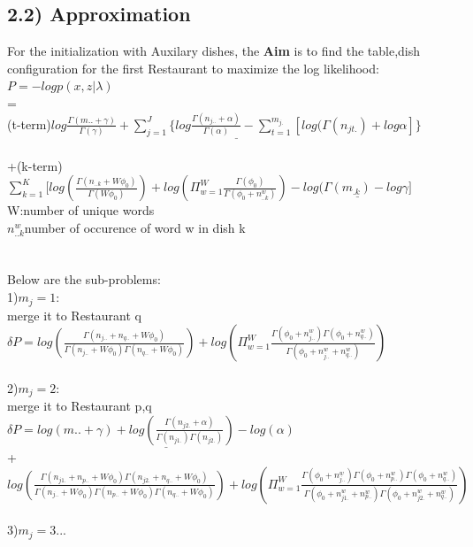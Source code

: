 \documentclass{article}
\begin{document}
\begin{spacing}{1.1}
\subsection{2.2) Approximation}
For the initialization with Auxilary dishes, the {\bf Aim} is to find the table,dish configuration for the first Restaurant
to maximize the log likelihood:\\
$P=-log p(x,z|\lambda)$\\ =\\
(t-term)$ \underline{log \frac{\Gamma(m..+\gamma)}{\Gamma(\gamma)}+\sum_{j=1}^{J} \{log \frac{\Gamma(n_{j..}+\alpha)}{\Gamma(\alpha)}-\sum_{t=1}^{m_{j.}}[log(\Gamma(n_{jt.})+log \alpha
]\}}$\\ \\
+(k-term)$ \sum_{k=1}^{K} [log(\frac{\Gamma(n_{..k}+W\phi_{0})}{\Gamma(W\phi_{0})})+log(\Pi_{w=1}^{W}\frac{\Gamma(\phi_{0})}{\Gamma(\phi_{0}+n_{..k}^{w})})
-\underline{log(\Gamma(m_{.k})-log \gamma]}$\\ W:number of unique words\\ 
$n_{..k}^{w}$number of occurence of word w in dish k \\ \\ \\ 
Below are the sub-problems:\\
1)$m_{j}=1$:\\merge it to Restaurant q\\
$\delta P=log(\frac{\Gamma(n_{j..}+n_{q..}+W\phi_{0})}{\Gamma(n_{j..}+W\phi_{0})\Gamma(n_{q..}+W\phi_{0})})+log(\Pi_{w=1}^{W}\frac{\Gamma(\phi_{0}+n_{j..}^{w})\Gamma(\phi_{0}+n_{q..}^{w})}{\Gamma(\phi_{0}+n_{j..}^{w}+n_{q..}^{w})})$\\ \\
2)$m_{j}=2$:\\merge it to Restaurant p,q\\
$\delta P=\underline{log(m..+\gamma)+log(\frac{\Gamma(n_{j2.}+\alpha)}{\Gamma(n_{j1.})\Gamma(n_{j2.})})-log(\alpha)}$\\
+\\$log(\frac{\Gamma(n_{j1.}+n_{p..}+W\phi_{0})\Gamma(n_{j2.}+n_{q..}+W\phi_{0})}{\Gamma(n_{j..}+W\phi_{0})\Gamma(n_{p..}+W\phi_{0})\Gamma(n_{q..}+W\phi_{0})})+log(\Pi_{w=1}^{W}\frac{\Gamma(\phi_{0}+n_{j..}^{w})\Gamma(\phi_{0}+n_{p..}^{w})\Gamma(\phi_{0}+n_{q..}^{w})}{\Gamma(\phi_{0}+n_{j1.}^{w}+n_{p..}^{w})\Gamma(\phi_{0}+n_{j2.}^{w}+n_{q..}^{w})})$\\ \\
3)$m_{j}=3$...\\ \\

\end{spacing}
\end{document}
